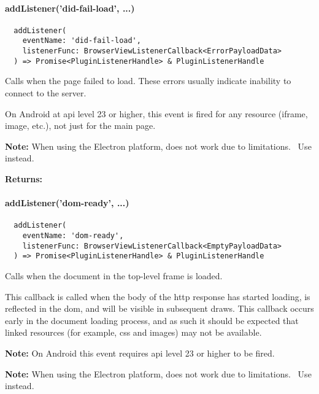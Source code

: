 \paragraph{addListener('did-fail-load', ...)}

\begin{verbatim}
  addListener(
    eventName: 'did-fail-load',
    listenerFunc: BrowserViewListenerCallback<ErrorPayloadData>
  ) => Promise<PluginListenerHandle> & PluginListenerHandle
\end{verbatim}

Calls  when the page failed to load. These errors usually indicate inability to connect to the server.

On Android at \ac{api} level 23 or higher, this event is fired for any resource (iframe, image, etc.), not just for the main page.~\cite{android:api}

\textbf{Note:} When using the Electron platform,  does not work due to limitations.~\cite{capacitor-electron}
Use  instead.

\textbf{Returns:} 



\paragraph{addListener('dom-ready', ...)}

\begin{verbatim}
  addListener(
    eventName: 'dom-ready',
    listenerFunc: BrowserViewListenerCallback<EmptyPayloadData>
  ) => Promise<PluginListenerHandle> & PluginListenerHandle
\end{verbatim}

Calls  when the document in the top-level frame is loaded.

This callback is called when the body of the \ac{http} response has started loading, is reflected in the \ac{dom},
and will be visible in subsequent draws. This callback occurs early in the document loading process,
and as such it should be expected that linked resources (for example, \ac{css} and images) may not be available.

\textbf{Note:} On Android this event requires \ac{api} level 23 or higher to be fired.~\cite{android:api}

\textbf{Note:} When using the Electron platform,  does not work due to limitations.~\cite{capacitor-electron}
Use  instead.

